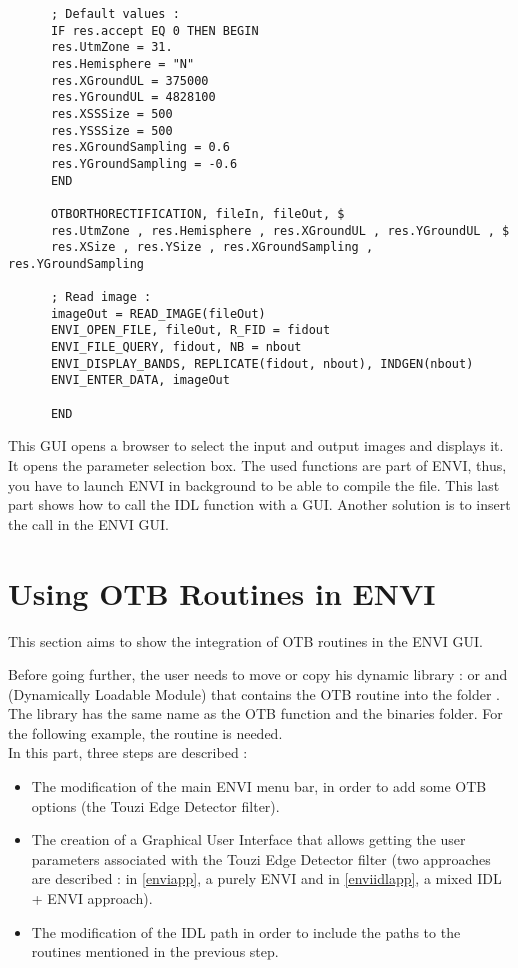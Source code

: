 \begin{verbatim}
      ; Default values :
      IF res.accept EQ 0 THEN BEGIN
      res.UtmZone = 31.
      res.Hemisphere = "N"
      res.XGroundUL = 375000
      res.YGroundUL = 4828100
      res.XSSSize = 500
      res.YSSSize = 500
      res.XGroundSampling = 0.6
      res.YGroundSampling = -0.6
      END

      OTBORTHORECTIFICATION, fileIn, fileOut, $
      res.UtmZone , res.Hemisphere , res.XGroundUL , res.YGroundUL , $
      res.XSize , res.YSize , res.XGroundSampling , res.YGroundSampling 

      ; Read image :
      imageOut = READ_IMAGE(fileOut)
      ENVI_OPEN_FILE, fileOut, R_FID = fidout
      ENVI_FILE_QUERY, fidout, NB = nbout
      ENVI_DISPLAY_BANDS, REPLICATE(fidout, nbout), INDGEN(nbout)
      ENVI_ENTER_DATA, imageOut

      END
\end{verbatim}
This GUI opens a browser to select the input and output images and displays it. It opens the parameter selection box. The used functions are part of ENVI, thus, you have to launch ENVI in background to be able to compile the file. This last part shows how to call the IDL function with a GUI. Another solution is to insert the call in the ENVI GUI.


\section{Using OTB Routines in ENVI}
\label{envi}
This section aims to show the integration of OTB routines in the ENVI GUI.

Before going further, the user needs to move or copy his dynamic library :  or  and  (Dynamically Loadable Module) 
that contains the OTB routine into the folder  .\\
The library has the same name as the OTB function and the binaries folder. For the following example, the  routine is needed.\\
In this part, three steps are described :
\begin{itemize}
    \item The modification of the main ENVI menu bar, in order to add some OTB options (the Touzi Edge Detector filter).
    \item The creation of a Graphical User Interface that allows getting the user parameters associated with the Touzi Edge Detector filter
    (two approaches are described : in \ref{enviapp}, a  purely ENVI  and in \ref{enviidlapp}, a  mixed IDL + ENVI  approach).
    \item The modification of the IDL path in order to include the paths to the routines mentioned in the previous step. 
\end{itemize}

